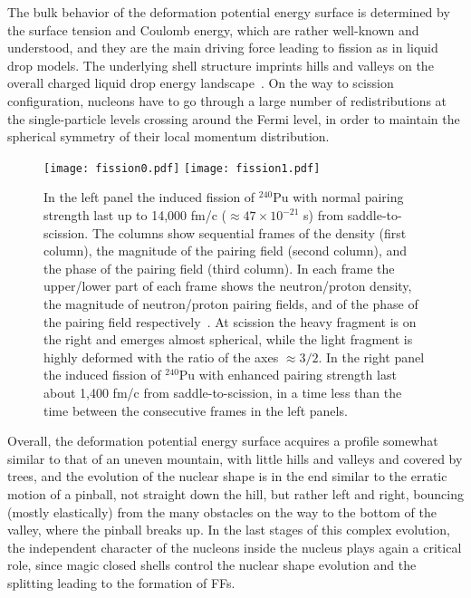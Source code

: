 \documentclass{webofc}
\begin{document}
The bulk behavior of the deformation potential energy surface is determined
by the surface tension
and Coulomb energy, which are rather well-known and understood,
and they are the main driving force leading to
fission as in liquid drop models.  The underlying shell structure imprints hills and
valleys on the
overall charged liquid drop energy landscape~\cite{RMP_1972r,RMP_1980r}. On the way to scission
configuration, nucleons have to go through a large number of
redistributions at the single-particle levels crossing around the
Fermi level, in order to maintain the spherical symmetry of their
local momentum distribution.
\begin{figure}[!ht]
\texttt{[image: fission0.pdf]}
\texttt{[image: fission1.pdf]}
\caption{ \label{fig:ab34}   In the left panel the induced fission of $^{240}$Pu with normal
pairing strength last up to 14,000 fm/c ($\approx 47\times 10^{-21}$ s) from saddle-to-scission. The
columns show sequential frames of the density (first column), the
magnitude of the pairing field (second column), and the phase of the
pairing field (third column).  In each frame the upper/lower part of
each frame shows the neutron/proton density, the magnitude of
neutron/proton pairing fields, and of the phase of the pairing field
respectively~\cite{Bulgac:2016}. At scission the heavy fragment is on
the right and emerges almost spherical, while the light fragment is
highly deformed with the ratio of the axes $\approx 3/2$.
In the right panel the induced fission of $^{240}$Pu with
enhanced pairing strength last about 1,400 fm/c from
saddle-to-scission,  in a time less than the time
between the consecutive frames in the left panels.}
\end{figure}
Overall, the
deformation potential energy surface acquires a profile somewhat
similar to that of an uneven mountain, with little hills and valleys
and covered by trees, and the evolution of the nuclear shape is in the
end similar to the erratic motion of a pinball, not straight down the
hill, but rather left and right, bouncing (mostly elastically) from
the many obstacles on the way to the bottom of the valley, where the
pinball breaks up. In the last stages of this complex
evolution, the independent character of the nucleons inside the nucleus
plays again a critical role, since magic closed shells control the nuclear
shape evolution and the splitting leading to the formation of FFs.
\end{document}
